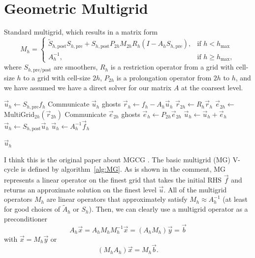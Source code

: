 \documentclass{article}
\begin{document}
\section{Geometric Multigrid}
\begin{algorithm}
\caption{Standard multigrid, which results in a matrix form 
\begin{equation*}
M_h = 
\begin{cases}
\tilde S_{h,\text{post}} S_{h,\text{pre}} + S_{h, \text{post}} P_{2h} M_{2h} R_h(I - A_h S_{h, \text{pre}}),& \text{if } h < h_\text{max} \\
A_h^{-1},& \text{if } h \geq h_\text{max},
\end{cases}
\end{equation*}
where $S_{h,\text{pre/post}}$ are smoothers, $R_h$ is a restriction operator from a grid with cell-size $h$ to a grid with cell-size $2h$, $P_{2h}$ is a prolongation operator from $2h$ to $h$, and we have assumed we have a direct solver for our matrix $A$ at the coarsest level.
\label{alg:MG}}
\begin{algorithmic}

    
        \State $\vec{u}_h \gets S_{h,\text{pre}} f_h$ 
        \State Communicate $\vec{u}_h$ ghosts
        \State $\vec{r}_h \gets f_h - A_h \vec{u}_h$
        \State $\vec{r}_{2h} \gets R_h \vec{r}_h$ 
        \State $\vec{e}_{2h} \gets $ MultiGrid$_{2h}(\vec{r}_{2h})$
        \State Communicate $\vec{e}_{2h}$ ghosts 
        \State $\vec{e}_h \gets P_{2h} \vec{e}_{2h}$ 
        \State $\vec{u}_h \gets \vec{u}_h + \vec{e}_h$
        \State $\vec{u}_h \gets S_{h,\text{post}} \vec{u}_h$ 
    \Else 
        \State $\vec{u}_h \gets A_h^{-1} \vec{f}_{h}$   
    \EndIf
    
    \State \Return $\vec{u}_h$
\EndProcedure 
\end{algorithmic} 
\end{algorithm}

I think this is the original paper about MGCG \cite{Tatebe:1993}. 
The basic multigrid (MG) V-cycle is defined by algorithm~\ref{alg:MG}. As is shown in the comment, MG represents a linear operator on the finest grid that takes the initial RHS $\vec{f}$ and 
returns an approximate solution on the finest level $\vec{u}$. All of the multigrid operators $M_h$ are linear operators that approximately satisfy $M_h \approx A_h^{-1}$ (at least for good choices of $\tilde A_h$ or $S_h$). Then, we can clearly use a multigrid operator as a preconditioner 
\begin{equation}
    A_h \vec{x} = A_h M_h M_h^{-1} \vec{x} = (A_h M_h) \vec{y} = \vec{b} 
\end{equation}
with $\vec{x} = M_h \vec{y}$ or 
\begin{equation}
   (M_h A_h) \vec{x} = M_h \vec{b}. 
\end{equation}
\end{document}
